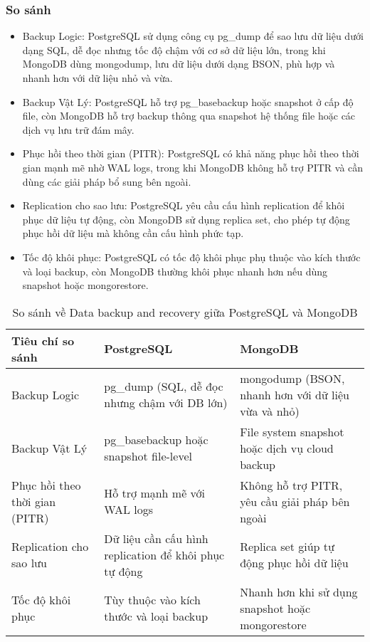 \subsubsection{So sánh}
\begin{itemize}
    \item Backup Logic: PostgreSQL sử dụng công cụ pg\_dump để sao lưu dữ liệu dưới dạng SQL, dễ đọc nhưng tốc độ chậm với cơ sở dữ liệu lớn, trong khi MongoDB dùng mongodump, lưu dữ liệu dưới dạng BSON, phù hợp và nhanh hơn với dữ liệu nhỏ và vừa.
    \item Backup Vật Lý: PostgreSQL hỗ trợ pg\_basebackup hoặc snapshot ở cấp độ file, còn MongoDB hỗ trợ backup thông qua snapshot hệ thống file hoặc các dịch vụ lưu trữ đám mây.
    \item Phục hồi theo thời gian (PITR): PostgreSQL có khả năng phục hồi theo thời gian mạnh mẽ nhờ WAL logs, trong khi MongoDB không hỗ trợ PITR và cần dùng các giải pháp bổ sung bên ngoài.
    \item Replication cho sao lưu: PostgreSQL yêu cầu cấu hình replication để khôi phục dữ liệu tự động, còn MongoDB sử dụng replica set, cho phép tự động phục hồi dữ liệu mà không cần cấu hình phức tạp.
    \item Tốc độ khôi phục: PostgreSQL có tốc độ khôi phục phụ thuộc vào kích thước và loại backup, còn MongoDB thường khôi phục nhanh hơn nếu dùng snapshot hoặc mongorestore.
\end{itemize}
\begin{table}[H]
    \centering
    \begin{tabular}{|L{3.2cm}|L{5.05cm}|L{5.05cm}|} \hline 
         \textbf{Tiêu chí so sánh }&  \textbf{PostgreSQL}&  \textbf{MongoDB}\\ \hline 
         Backup Logic & pg\_dump (SQL, dễ đọc nhưng chậm với DB lớn) & mongodump (BSON, nhanh hơn với dữ liệu vừa và nhỏ)\\ \hline 
         Backup Vật Lý & pg\_basebackup hoặc snapshot file-level & File system snapshot hoặc dịch vụ cloud backup\\ \hline 
         Phục hồi theo thời gian (PITR) & Hỗ trợ mạnh mẽ với WAL logs & Không hỗ trợ PITR, yêu cầu giải pháp bên ngoài\\ \hline 
         Replication cho sao lưu & Dữ liệu cần cấu hình replication để khôi phục tự động & Replica set giúp tự động phục hồi dữ liệu\\ \hline 
         Tốc độ khôi phục & Tùy thuộc vào kích thước và loại backup & Nhanh hơn khi sử dụng snapshot hoặc mongorestore\\ \hline
    \end{tabular}
    \caption{So sánh về Data backup and recovery giữa PostgreSQL và MongoDB}
    \label{tab:data_backup_and_recovery}
\end{table}
\newpage
